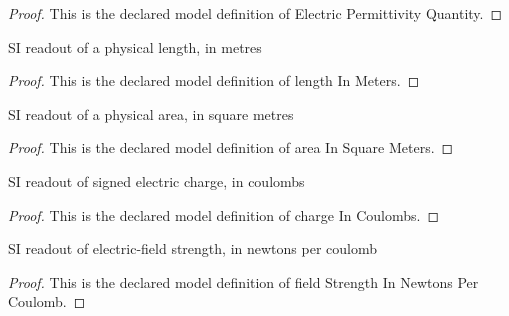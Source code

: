 \begin{proof}
  This is the declared model definition of Electric Permittivity Quantity.
\end{proof}
\begin{definition}
  \label{def:physics:phyx-mini-0840:phyxminiproblems-problemphyxmini0840-lengthinmeters}
  SI readout of a physical length, in metres
\end{definition}
\begin{proof}
  This is the declared model definition of length In Meters.
\end{proof}
\begin{definition}
  \label{def:physics:phyx-mini-0840:phyxminiproblems-problemphyxmini0840-areainsquaremeters}
  SI readout of a physical area, in square metres
\end{definition}
\begin{proof}
  This is the declared model definition of area In Square Meters.
\end{proof}
\begin{definition}
  \label{def:physics:phyx-mini-0840:phyxminiproblems-problemphyxmini0840-chargeincoulombs}
  SI readout of signed electric charge, in coulombs
\end{definition}
\begin{proof}
  This is the declared model definition of charge In Coulombs.
\end{proof}
\begin{definition}
  \label{def:physics:phyx-mini-0840:phyxminiproblems-problemphyxmini0840-fieldstrengthinnewtonspercoulomb}
  SI readout of electric-field strength, in newtons per coulomb
\end{definition}
\begin{proof}
  This is the declared model definition of field Strength In Newtons Per Coulomb.
\end{proof}
